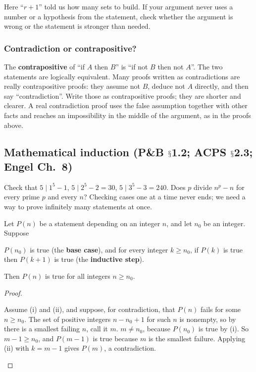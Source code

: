 \documentclass[10pt]{scrartcl}
\renewcommand{\S}{\ensuremath{\mathsection}}
\begin{document}
\begin{remark*}
  Here ``$r+1$'' told us how many sets to build. If your argument never uses a number or a hypothesis from the statement, check whether the argument is wrong or the statement is stronger than needed.
\end{remark*}

\subsubsection*{Contradiction or contrapositive?}
The \textbf{contrapositive} of ``if $A$ then $B$'' is ``if not $B$ then not $A$''. The two statements are logically equivalent. Many proofs written as contradictions are really contrapositive proofs: they assume not $B$, deduce not $A$ directly, and then say ``contradiction''. Write those as contrapositive proofs; they are shorter and clearer. A real contradiction proof uses the false assumption together with other facts and reaches an impossibility in the middle of the argument, as in the proofs above.

\subsection{Mathematical induction (P\&B \S1.2; ACPS \S2.3; Engel Ch.~8)}\label{sec:induction}

\begin{qbox}
  Check that $5 \mid 1^5 - 1$, $5 \mid 2^5 - 2 = 30$, $5 \mid 3^5 - 3 = 240$. Does $p$ divide $n^p - n$ for every prime $p$ and every $n$? Checking cases one at a time never ends; we need a way to prove infinitely many statements at once.
\end{qbox}

\begin{theorem*}
  Let $P(n)$ be a statement depending on an integer $n$, and let $n_0$ be an integer. Suppose
  \begin{enumerate}
    \ii[(i)] $P(n_0)$ is true (the \textbf{base case}), and
    \ii[(ii)] for every integer $k \geq n_0$, if $P(k)$ is true then $P(k+1)$ is true (the \textbf{inductive step}).
  \end{enumerate}
  Then $P(n)$ is true for all integers $n \geq n_0$.
\end{theorem*}
\begin{proof}
  \begin{steps}
    \ii Assume (i) and (ii), and suppose, for contradiction, that $P(n)$ fails for some $n \geq n_0$. The set of positive integers $n - n_0 + 1$ for such $n$ is nonempty, so by  there is a smallest failing $n$, call it $m$.
    \ii $m \neq n_0$, because $P(n_0)$ is true by (i). So $m - 1 \geq n_0$, and $P(m-1)$ is true because $m$ is the smallest failure.
    \ii Applying (ii) with $k = m - 1$ gives $P(m)$, a contradiction.
  \end{steps}
\end{proof}
\end{document}
